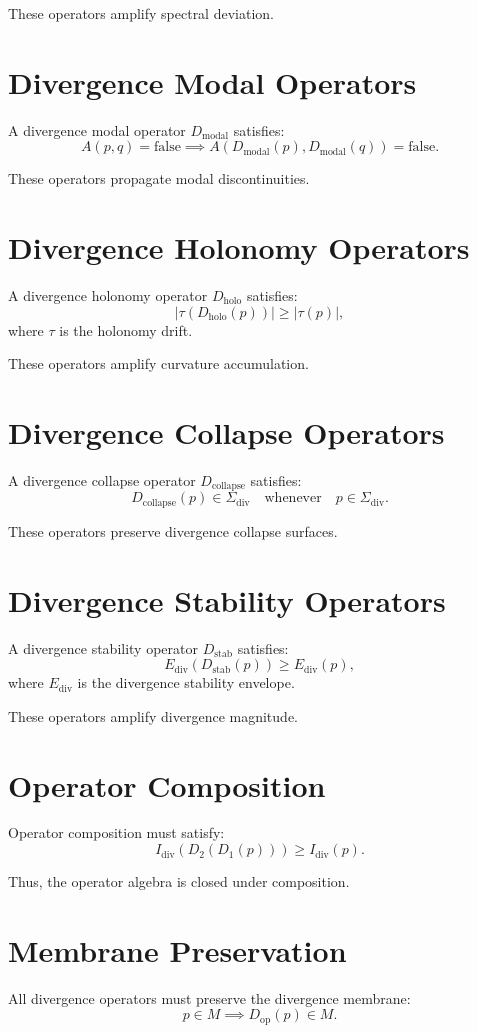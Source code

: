 \documentclass[11pt]{article}
\begin{document}
These operators amplify spectral deviation.

\section{Divergence Modal Operators}
A divergence modal operator $D_{\text{modal}}$ satisfies:
\[
A(p,q) = \text{false} \implies A(D_{\text{modal}}(p), D_{\text{modal}}(q)) = \text{false}.
\]

These operators propagate modal discontinuities.

\section{Divergence Holonomy Operators}
A divergence holonomy operator $D_{\text{holo}}$ satisfies:
\[
|\tau(D_{\text{holo}}(p))| \geq |\tau(p)|,
\]
where $\tau$ is the holonomy drift.

These operators amplify curvature accumulation.

\section{Divergence Collapse Operators}
A divergence collapse operator $D_{\text{collapse}}$ satisfies:
\[
D_{\text{collapse}}(p) \in \Sigma_{\text{div}}
\quad \text{whenever} \quad p \in \Sigma_{\text{div}}.
\]

These operators preserve divergence collapse surfaces.

\section{Divergence Stability Operators}
A divergence stability operator $D_{\text{stab}}$ satisfies:
\[
E_{\text{div}}(D_{\text{stab}}(p)) \geq E_{\text{div}}(p),
\]
where $E_{\text{div}}$ is the divergence stability envelope.

These operators amplify divergence magnitude.

\section{Operator Composition}
Operator composition must satisfy:
\[
I_{\text{div}}(D_2(D_1(p))) \geq I_{\text{div}}(p).
\]

Thus, the operator algebra is closed under composition.

\section{Membrane Preservation}
All divergence operators must preserve the divergence membrane:
\[
p \in M \implies D_{\text{op}}(p) \in M.
\]
\end{document}
